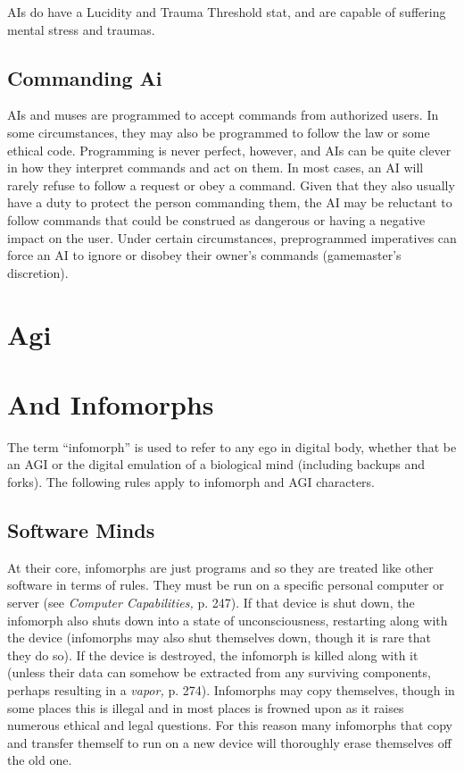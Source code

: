 AIs do have a Lucidity and Trauma Threshold stat, 
and are capable of suffering mental stress and traumas.

\subsection{Commanding Ai}

AIs and muses are programmed to accept commands 
from authorized users. In some circumstances, they 
may also be programmed to follow the law or some 
ethical code. Programming is never perfect, however, 
and AIs can be quite clever in how they interpret 
commands and act on them. In most cases, an AI will 
rarely refuse to follow a request or obey a command. 
Given that they also usually have a duty to protect the 
person commanding them, the AI may be reluctant to 
follow commands that could be construed as dangerous
or having a negative impact on the user. Under
certain circumstances, preprogrammed imperatives 
can force an AI to ignore or disobey their owner's 
commands (gamemaster's discretion).

\section{Agi}


\section{ And Infomorphs}

The term ``infomorph'' is used to refer to any ego in 
digital body, whether that be an AGI or the digital 
emulation of a biological mind (including backups 
and forks). The following rules apply to infomorph 
and AGI characters.

\subsection{Software Minds}

At their core, infomorphs are just programs and so 
they are treated like other software in terms of rules. 
They must be run on a specific personal computer or 
server (see \textit{Computer Capabilities,} p. 247). If that 
device is shut down, the infomorph also shuts down 
into a state of unconsciousness, restarting along with 
the device (infomorphs may also shut themselves 
down, though it is rare that they do so). If the device is 
destroyed, the infomorph is killed along with it (unless 
their data can somehow be extracted from any surviving
components, perhaps resulting in a \textit{vapor,} p. 274).
Infomorphs may copy themselves, though in some 
places this is illegal and in most places is frowned 
upon as it raises numerous ethical and legal questions. 
For this reason many infomorphs that copy and transfer
themself to run on a new device will thoroughly
erase themselves off the old one.

